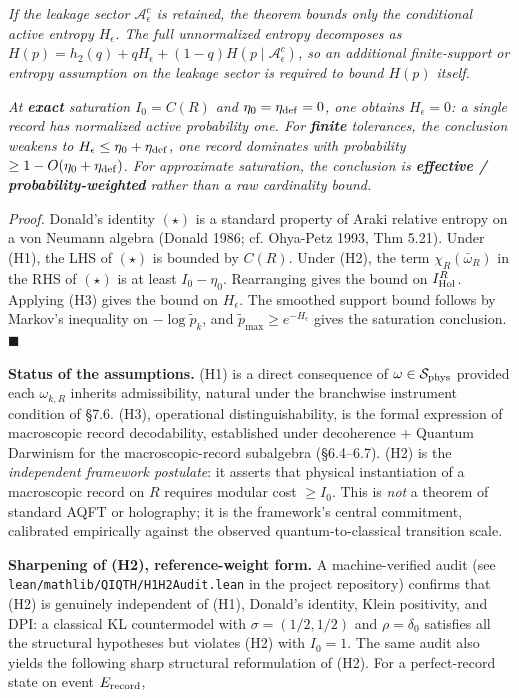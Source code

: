 \documentclass[11pt,a4paper]{article}
\begin{document}
\emph{If the leakage sector $\mathcal{A}_\epsilon^c$ is retained, the theorem bounds only the conditional active entropy $H_\epsilon$. The full unnormalized entropy decomposes as $H(p) = h_2(q) + q H_\epsilon + (1-q) H(p \mid \mathcal{A}_\epsilon^c)$, so an additional finite-support or entropy assumption on the leakage sector is required to bound $H(p)$ itself.}

\emph{At \textbf{exact} saturation $I_0 = C(R)$ and $\eta_0 = \eta_{\rm def} = 0$, one obtains $H_\epsilon = 0$: a single record has normalized active probability one. For \textbf{finite} tolerances, the conclusion weakens to $H_\epsilon \le \eta_0 + \eta_{\rm def}$, one record dominates with probability $\ge 1 - O(\eta_0 + \eta_{\rm def})$. For approximate saturation, the conclusion is \textbf{effective / probability-weighted} rather than a raw cardinality bound.}

\emph{Proof.} Donald's identity $(\star)$ is a standard property of Araki relative entropy on a von Neumann algebra (Donald 1986; cf. Ohya-Petz 1993, Thm 5.21). Under (H1), the LHS of $(\star)$ is bounded by $C(R)$. Under (H2), the term $\chi_R(\bar\omega_R)$ in the RHS of $(\star)$ is at least $I_0 - \eta_0$. Rearranging gives the bound on $I_{\rm Hol}^R$. Applying (H3) gives the bound on $H_\epsilon$. The smoothed support bound follows by Markov's inequality on $-\log \tilde p_k$, and $\tilde p_{\max} \ge e^{-H_\epsilon}$ gives the saturation conclusion. $\blacksquare$

\textbf{Status of the assumptions.} (H1) is a direct consequence of $\omega \in \mathcal{S}_{\rm phys}$ provided each $\omega_{k,R}$ inherits admissibility, natural under the branchwise instrument condition of §7.6. (H3), operational distinguishability, is the formal expression of macroscopic record decodability, established under decoherence + Quantum Darwinism for the macroscopic-record subalgebra (§6.4–6.7). (H2) is the \emph{independent framework postulate}: it asserts that physical instantiation of a macroscopic record on $R$ requires modular cost $\ge I_0$. This is \emph{not} a theorem of standard AQFT or holography; it is the framework's central commitment, calibrated empirically against the observed quantum-to-classical transition scale.

\textbf{Sharpening of (H2), reference-weight form.} A machine-verified audit (see \texttt{lean/mathlib/QIQTH/H1H2Audit.lean} in the project repository) confirms that (H2) is genuinely independent of (H1), Donald's identity, Klein positivity, and DPI: a classical KL countermodel with $\sigma=(1/2,1/2)$ and $\rho=\delta_0$ satisfies all the structural hypotheses but violates (H2) with $I_0=1$. The same audit also yields the following sharp structural reformulation of (H2). For a perfect-record state on event $E_{\rm record}$,
\end{document}
